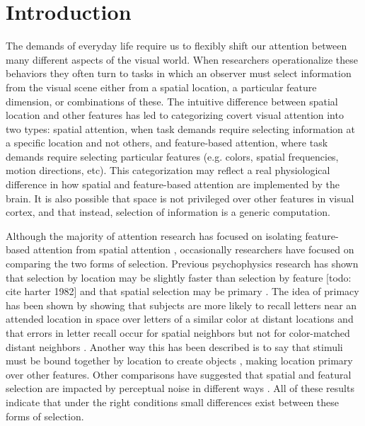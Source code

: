 
\section{Introduction}

The demands of everyday life require us to flexibly shift our attention between many different aspects of the visual world. When researchers operationalize these behaviors they often turn to tasks in which an observer must select information from the visual scene either from a spatial location, a particular feature dimension, or combinations of these. The intuitive difference between spatial location and other features has led to categorizing covert visual attention into two types: spatial attention, when task demands require selecting information at a specific location and not others, and feature-based attention, where task demands require selecting particular features (e.g. colors, spatial frequencies, motion directions, etc). This categorization may reflect a real physiological difference in how spatial and feature-based attention are implemented by the brain. It is also possible that space is not privileged over other features in visual cortex, and that instead, selection of information is a generic computation.

Although the majority of attention research has focused on isolating feature-based attention from spatial attention \citep{Saenz2002-fs}, occasionally researchers have focused on comparing the two forms of selection. Previous psychophysics research has shown that selection by location may be slightly faster than selection by feature \citep{Liu2007-ed,Hillyard1984-qk} [todo: cite harter 1982] and that spatial selection may be primary \citep{Soto2004-cs,Tsal1988-qx}. The idea of primacy has been shown by showing that subjects are more likely to recall letters near an attended location in space over letters of a similar color at distant locations \citep{Tsal1988-qx} and that errors in letter recall occur for spatial neighbors but not for color-matched distant neighbors \citep{Snyder1972-og}. Another way this has been described is to say that stimuli must be bound together by location to create objects \citep{Treisman1980-gu}, making location primary over other features. Other comparisons have suggested that spatial and featural selection are impacted by perceptual noise in different ways \citep{Ling2009-rq}. All of these results indicate that under the right conditions small differences exist between these forms of selection.

